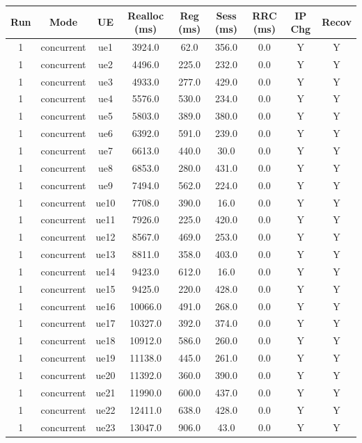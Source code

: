 \begin{table}[ht]
\centering
\begin{tabular}{|c|c|c|c|c|c|c|c|c|}
\hline
Run & Mode & UE & Realloc (ms) & Reg (ms) & Sess (ms) & RRC (ms) & IP Chg & Recov \\
\hline
1 & concurrent & ue1 & 3924.0 & 62.0 & 356.0 & 0.0 & Y & Y \\
1 & concurrent & ue2 & 4496.0 & 225.0 & 232.0 & 0.0 & Y & Y \\
1 & concurrent & ue3 & 4933.0 & 277.0 & 429.0 & 0.0 & Y & Y \\
1 & concurrent & ue4 & 5576.0 & 530.0 & 234.0 & 0.0 & Y & Y \\
1 & concurrent & ue5 & 5803.0 & 389.0 & 380.0 & 0.0 & Y & Y \\
1 & concurrent & ue6 & 6392.0 & 591.0 & 239.0 & 0.0 & Y & Y \\
1 & concurrent & ue7 & 6613.0 & 440.0 & 30.0 & 0.0 & Y & Y \\
1 & concurrent & ue8 & 6853.0 & 280.0 & 431.0 & 0.0 & Y & Y \\
1 & concurrent & ue9 & 7494.0 & 562.0 & 224.0 & 0.0 & Y & Y \\
1 & concurrent & ue10 & 7708.0 & 390.0 & 16.0 & 0.0 & Y & Y \\
1 & concurrent & ue11 & 7926.0 & 225.0 & 420.0 & 0.0 & Y & Y \\
1 & concurrent & ue12 & 8567.0 & 469.0 & 253.0 & 0.0 & Y & Y \\
1 & concurrent & ue13 & 8811.0 & 358.0 & 403.0 & 0.0 & Y & Y \\
1 & concurrent & ue14 & 9423.0 & 612.0 & 16.0 & 0.0 & Y & Y \\
1 & concurrent & ue15 & 9425.0 & 220.0 & 428.0 & 0.0 & Y & Y \\
1 & concurrent & ue16 & 10066.0 & 491.0 & 268.0 & 0.0 & Y & Y \\
1 & concurrent & ue17 & 10327.0 & 392.0 & 374.0 & 0.0 & Y & Y \\
1 & concurrent & ue18 & 10912.0 & 586.0 & 260.0 & 0.0 & Y & Y \\
1 & concurrent & ue19 & 11138.0 & 445.0 & 261.0 & 0.0 & Y & Y \\
1 & concurrent & ue20 & 11392.0 & 360.0 & 390.0 & 0.0 & Y & Y \\
1 & concurrent & ue21 & 11990.0 & 600.0 & 437.0 & 0.0 & Y & Y \\
1 & concurrent & ue22 & 12411.0 & 638.0 & 428.0 & 0.0 & Y & Y \\
1 & concurrent & ue23 & 13047.0 & 906.0 & 43.0 & 0.0 & Y & Y \\

\end{tabular}
\end{table}
